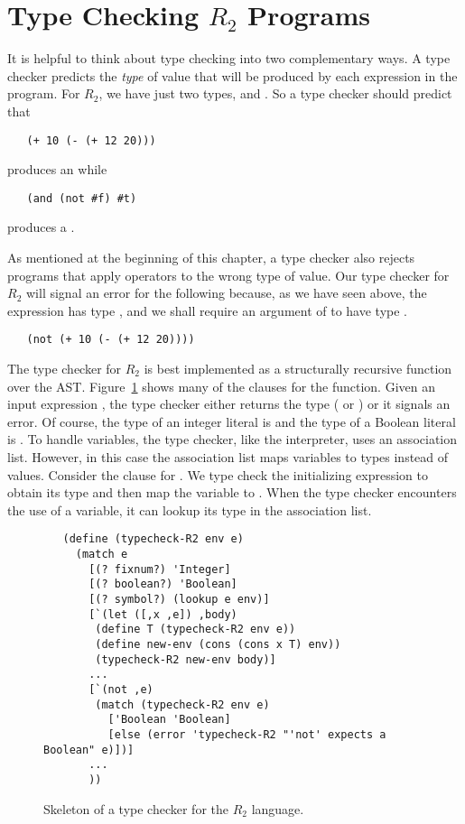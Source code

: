 \documentclass[11pt]{book}
\begin{document}
\section{Type Checking $R_2$ Programs}
\label{sec:type-check-r2}

It is helpful to think about type checking into two complementary
ways. A type checker predicts the \emph{type} of value that will be
produced by each expression in the program.  For $R_2$, we have just
two types,  and . So a type checker should
predict that
\begin{lstlisting}
   (+ 10 (- (+ 12 20)))
\end{lstlisting}
produces an  while
\begin{lstlisting}
   (and (not #f) #t)
\end{lstlisting}
produces a .

As mentioned at the beginning of this chapter, a type checker also
rejects programs that apply operators to the wrong type of value. Our
type checker for $R_2$ will signal an error for the following because,
as we have seen above, the expression  has type
, and we shall require an argument of  to have
type .
\begin{lstlisting}
   (not (+ 10 (- (+ 12 20))))
\end{lstlisting}

The type checker for $R_2$ is best implemented as a structurally
recursive function over the AST. Figure~\ref{fig:type-check-R2} shows
many of the clauses for the  function.  Given an
input expression , the type checker either returns the type
( or ) or it signals an error.  Of course,
the type of an integer literal is  and the type of a
Boolean literal is .  To handle variables, the type
checker, like the interpreter, uses an association list. However, in
this case the association list maps variables to types instead of
values. Consider the clause for .  We type check the
initializing expression to obtain its type  and then map the
variable  to . When the type checker encounters the
use of a variable, it can lookup its type in the association list.

\begin{figure}[tbp]
\begin{lstlisting}
   (define (typecheck-R2 env e)
     (match e
       [(? fixnum?) 'Integer]
       [(? boolean?) 'Boolean]
       [(? symbol?) (lookup e env)]
       [`(let ([,x ,e]) ,body)
        (define T (typecheck-R2 env e))
        (define new-env (cons (cons x T) env))
        (typecheck-R2 new-env body)]
       ...
       [`(not ,e)
        (match (typecheck-R2 env e)
          ['Boolean 'Boolean]
          [else (error 'typecheck-R2 "'not' expects a Boolean" e)])]
       ...
       ))
\end{lstlisting}
\caption{Skeleton of a type checker for the $R_2$ language.}
\label{fig:type-check-R2}
\end{figure}
\end{document}
